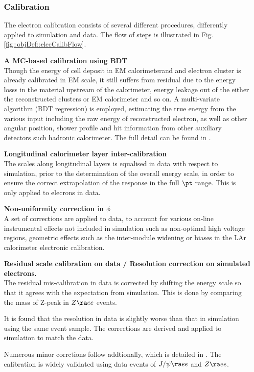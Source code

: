 \subsubsection{Calibration} \label{sec::objDef::electrons::calib}
The electron calibration consists of several different procedures, differently applied to simulation and data.
The flow of steps is illustrated in Fig. \ref{fig::objDef::elecCalibFlow}.

\begin{description}
\item \textbf{A MC-based calibration using BDT} \\
Though the energy of cell deposit in EM calorimeterand and electron cluster is already calibrated in EM scale, 
it still suffers from residual due to the energy losss in the material upstream of the calorimeter, energy leakage out of the either the reconstructed clusters or EM calorimeter and so on.
A multi-variate algorithm (BDT regression) is employed, 
estimating the true energy from the various input including the raw energy of reconstructed electron, as well as other angular position, shower profile and hit information from other auxiliary detectors such hadronic calorimeter.
The full detail can be found in \cite{161_egammaCalibRun1} \cite{egammaCalib2015}. \\

\item \textbf{Longitudinal calorimeter layer inter-calibration} \\
The scales along longitudinal layers is equalised in data with respect to simulation, prior to the determination of the overall energy scale, in order to ensure the correct extrapolation of the response in the full $\pt$ range. This is only applied to elecrons in data.

\item \textbf{Non-uniformity correction in $\phi$} \\
A set of corrections are applied to data, to account for various on-line instrumental effects not included in simulation such as non-optimal high voltage regions, geometric effects such as the inter-module widening or biases in the LAr calorimeter electronic calibration.

\item \textbf{Residual scale calibration on data / Resolution correction on simulated electrons.}  \\
The residual mis-calibration in data is corrected by shifting the energy scale so that it agrees with the expectation from simulation. This is done by comparing the mass of Z-peak in $Z \ra ee$ events.

It is found that the resolution in data is slightly worse than that in simulation using the same event sample.
The corrections are derived and applied to simulation to match the data. 
\end{description}
Numerous minor corrctions follow addtionally, which is detailed in \cite{161_egammaCalibRun1}. 
The calibration is widely validated using data events of $J/\psi \ra e e$ and $Z\ra ee$.


